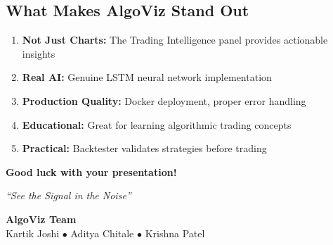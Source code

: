 \documentclass[12pt,a4paper]{article}
\begin{document}
\subsection{What Makes AlgoViz Stand Out}
\begin{enumerate}
    \item \textbf{Not Just Charts:} The Trading Intelligence panel provides actionable insights
    \item \textbf{Real AI:} Genuine LSTM neural network implementation
    \item \textbf{Production Quality:} Docker deployment, proper error handling
    \item \textbf{Educational:} Great for learning algorithmic trading concepts
    \item \textbf{Practical:} Backtester validates strategies before trading
\end{enumerate}

\vspace{1cm}

\begin{center}
\textbf{\Large Good luck with your presentation!}

\vspace{0.5cm}

\textit{``See the Signal in the Noise''}

\vspace{1cm}

\textcolor{algovizpurple}{\textbf{AlgoViz Team}}\\
Kartik Joshi $\bullet$ Aditya Chitale $\bullet$ Krishna Patel
\end{center}
\end{document}
